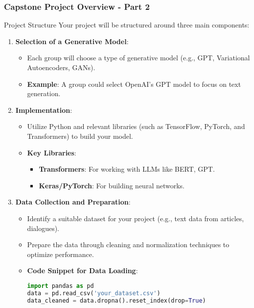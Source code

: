 \documentclass[aspectratio=169]{beamer}
\begin{document}
\begin{frame}[fragile]
    \frametitle{Capstone Project Overview - Part 2}
    \begin{block}{Project Structure}
        Your project will be structured around three main components:
        \begin{enumerate}
            \item \textbf{Selection of a Generative Model}:
            \begin{itemize}
                \item Each group will choose a type of generative model (e.g., GPT, Variational Autoencoders, GANs).
                \item \textbf{Example}: A group could select OpenAI’s GPT model to focus on text generation.
            \end{itemize}
            \item \textbf{Implementation}:
            \begin{itemize}
                \item Utilize Python and relevant libraries (such as TensorFlow, PyTorch, and Transformers) to build your model.
                \item \textbf{Key Libraries}:
                \begin{itemize}
                    \item \textbf{Transformers}: For working with LLMs like BERT, GPT.
                    \item \textbf{Keras/PyTorch}: For building neural networks.
                \end{itemize}
            \end{itemize}
            \item \textbf{Data Collection and Preparation}:
            \begin{itemize}
                \item Identify a suitable dataset for your project (e.g., text data from articles, dialogues).
                \item Prepare the data through cleaning and normalization techniques to optimize performance.
                \item \textbf{Code Snippet for Data Loading}:
                \begin{lstlisting}[language=Python]
import pandas as pd
data = pd.read_csv('your_dataset.csv')
data_cleaned = data.dropna().reset_index(drop=True)
                \end{lstlisting}
            \end{itemize}
        \end{enumerate}
    \end{block}
\end{frame}
\end{document}
